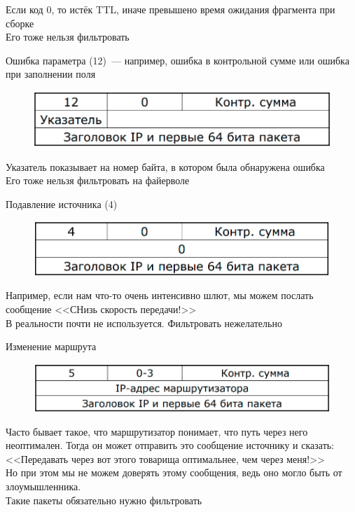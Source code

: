 \begin{MyItemize}
\begin{figure}[H]
    \end{figure}
    Если код 0, то истёк TTL, иначе превышено время ожидания фрагмента при сборке\\
    Его тоже нельзя фильтровать
    \item Ошибка параметра (12)~--- например, ошибка в контрольной сумме или ошибка при заполнении поля\\
    \begin{figure}[H]
        \centering
        \includegraphics[width=15cm]{images/02/12}
    \end{figure}
    Указатель показывает на номер байта, в котором была обнаружена ошибка\\
    Его тоже нельзя фильтровать на файерволе
\end{MyItemize}



\begin{MyItemize}
    \item Подавление источника (4)\\
    \begin{figure}[H]
        \centering
        \includegraphics[width=15cm]{images/02/13}
    \end{figure}
    Например, если нам что-то очень интенсивно шлют, мы можем послать сообщение <<СНизь скорость передачи!>>\\
    В реальности почти не используется. Фильтровать нежелательно
    \item Изменение маршрута\\
    \begin{figure}[H]
        \centering
        \includegraphics[width=15cm]{images/02/14}
    \end{figure}
    Часто бывает такое, что маршрутизатор понимает, что путь через него неоптимален. Тогда он может отправить это сообщение источнику и сказать: <<Передавать через вот этого товарища оптимальнее, чем через меня!>>\\
    Но при этом мы не можем доверять этому сообщения, ведь оно могло быть от злоумышленника.\\
    Такие пакеты обязательно нужно фильтровать
\end{MyItemize}

